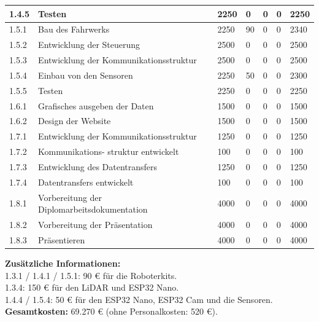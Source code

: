 \begin{longtable}[c]{|p{}|p{3cm}|p{}|p{}|p{2cm}|p{}|p{}|}
\hline
1.4.5 & Testen & 2250 & 0 & 0 & 0 & 2250 \\
\hline
1.5.1 & Bau des Fahrwerks & 2250 & 90 & 0 & 0 & 2340 \\
\hline
1.5.2 & Entwicklung der Steuerung & 2500 & 0 & 0 & 0 & 2500 \\
\hline
1.5.3 & Entwicklung der Kommunikationsstruktur & 2500 & 0 & 0 & 0 & 2500 \\
\hline
1.5.4 & Einbau von den Sensoren & 2250 & 50 & 0 & 0 & 2300 \\
\hline
1.5.5 & Testen & 2250 & 0 & 0 & 0 & 2250 \\
\hline
1.6.1 & Grafisches ausgeben der Daten & 1500 & 0 & 0 & 0 & 1500 \\
\hline
1.6.2 & Design der Website & 1500 & 0 & 0 & 0 & 1500 \\
\hline
1.7.1 & Entwicklung der Kommunikationsstruktur & 1250 & 0 & 0 & 0 & 1250 \\
\hline
1.7.2 & Kommunikations-  struktur entwickelt & 100 & 0 & 0 & 0 & 100 \\
\hline
1.7.3 & Entwicklung des Datentransfers & 1250 & 0 & 0 & 0 & 1250 \\
\hline
1.7.4 & Datentransfers entwickelt & 100 & 0 & 0 & 0 & 100 \\
\hline
1.8.1 & Vorbereitung der Diplomarbeitsdokumentation & 4000 & 0 & 0 & 0 & 4000 \\
\hline
1.8.2 & Vorbereitung der Präsentation & 4000 & 0 & 0 & 0 & 4000 \\
\hline
1.8.3 & Präsentieren & 4000 & 0 & 0 & 0 & 4000 \\
\hline
\end{longtable}
%
\textbf{Zusätzliche Informationen:} \\
1.3.1 / 1.4.1 / 1.5.1: 90 € für die Roboterkits. \\
1.3.4: 150 € für den LiDAR und ESP32 Nano. \\
1.4.4 / 1.5.4: 50 € für den ESP32 Nano, ESP32 Cam und die Sensoren. \\
%
\textbf{Gesamtkosten:} 69.270 € (ohne Personalkosten: 520 €).

% 
